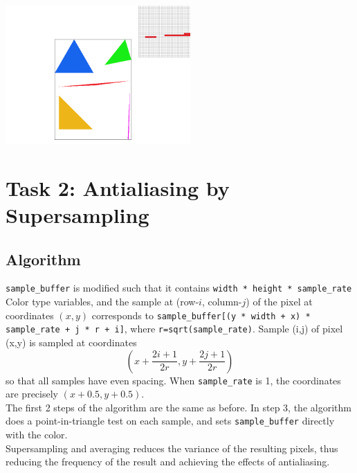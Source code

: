\documentclass[11pt]{article}
\begin{document}
\includegraphics[width=200pt]{screenshot_2-15_3-21-33.png}

\section{Task 2: Antialiasing by Supersampling}
\subsection{Algorithm}
\par\verb|sample_buffer| is modified such that it contains \verb|width * height * sample_rate| Color type variables, and the sample at (row-$i$, column-$j$) of the pixel at coordinates $(x,y)$ corresponds to \verb|sample_buffer[(y * width + x) * sample_rate + j * r + i]|, where \verb|r=sqrt(sample_rate)|. Sample (i,j) of pixel (x,y) is sampled at coordinates $$(x+\frac{2i+1}{2r},y+\frac{2j+1}{2r})$$so that all samples have even spacing. When \verb|sample_rate| is 1, the coordinates are precisely $(x+0.5,y+0.5)$.
\\The first 2 steps of the algorithm are the same as before. In step 3, the algorithm does a point-in-triangle test on each sample, and sets \verb|sample_buffer| directly with the color.\\
Supersampling and averaging reduces the variance of the resulting pixels, thus reducing the frequency of the result and achieving the effects of antialiasing.
\end{document}
